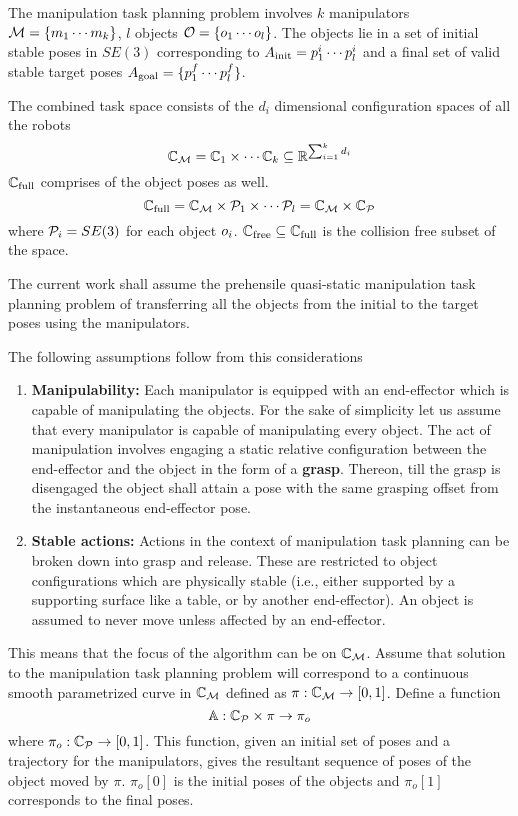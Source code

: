 The manipulation task planning problem involves $k$ manipulators $\mathcal{M}=\{m_1 \cdots m_k\}$, $l$ objects $\mathcal{O}=\{o_1\cdots o_l\}$. The objects lie in a set of initial stable poses in $SE(3)$ corresponding to $A_{\rm init}={p_1^i \cdots p_l^i }$ and a final set of valid stable target poses $A_{\rm goal}=\{p_1^f \cdots p_l^f \}$.

The combined task space consists of the $d_i$ dimensional configuration spaces of all the robots 
$$\mathbb{C}_{\mathcal{M}} = \mathbb{C}_1 \times \cdots \mathbb{C}_k \subseteq \mathbb{R}^{\sum_{i=1}^{k} d_i}$$
$\mathbb{C}_{{\rm full}}$ comprises of the object poses as well.
$$ \mathbb{C}_{{\rm full}} = \mathbb{C}_{\mathcal{M}} \times \mathcal{P}_1 \times \cdots \mathcal{P}_l  = \mathbb{C}_{\mathcal{M}} \times \mathbb{C}_{\mathcal{P}}$$
where $\mathcal{P}_i=SE(3)$ for each object $o_i$.
$\mathbb{C}_{{\rm free}} \subseteq \mathbb{C}_{{\rm full}}$ is the collision free subset of the space.

The current work shall assume the prehensile quasi-static manipulation task planning problem of transferring all the objects from the initial to the target poses using the manipulators. 

The following assumptions follow from this considerations
\begin{enumerate}
\item \textbf{Manipulability:} Each manipulator is equipped with an end-effector which is capable of manipulating the objects. For the sake of simplicity let us assume that every manipulator is capable of manipulating every object. The act of manipulation involves engaging a static relative configuration between the end-effector and the object in the form of a \textbf{grasp}. Thereon, till the grasp is disengaged the object shall attain a pose with the same grasping offset from the instantaneous end-effector pose. 
\item \textbf{Stable actions:} Actions in the context of manipulation task planning can be broken down into grasp and release. These are restricted to object configurations which are physically stable (i.e., either supported by a supporting surface like a table, or by another end-effector). An object is assumed to never move unless affected by an end-effector.
\end{enumerate}

This means that the focus of the algorithm can be on $\mathbb{C}_{\mathcal{M}}$. 
Assume that solution to the manipulation task planning problem will correspond to a continuous smooth parametrized curve in $\mathbb{C}_{\mathcal{M}}$ defined as $\pi : \mathbb{C}_{\mathcal{M}} \rightarrow [0,1]$. Define a function 
$$ \mathbb{A} : \mathbb{C}_{\mathcal{P}} \times \pi \rightarrow \pi_o $$
where $ \pi_o : \mathbb{C}_{\mathcal{P}} \rightarrow [0,1]$. This function, given an initial set of poses and a trajectory for the manipulators, gives the resultant sequence of poses of the object moved by $\pi$. $\pi_o[0]$ is the initial poses of the objects and $\pi_o[1]$ corresponds to the final poses.

